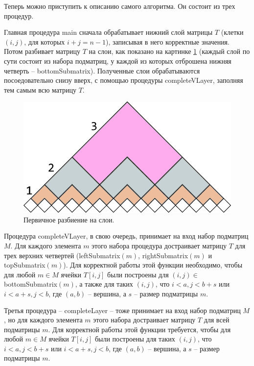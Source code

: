 \documentclass[12pt]{article}  %
\theoremstyle{definition}
\theoremstyle{remark}
\begin{document}
Теперь можно приступить к описанию самого алгоритма. Он состоит из трех процедур.

Главная процедура main сначала обрабатывает нижний слой матрицы $T$ (клетки $(i,j)$, для которых $i+j=n-1$), записывая в него корректные значения. Потом разбивает матрицу $T$ на слои, как показано на картинке \ref{gr:layers} (каждый слой по сути состоит из набора подматриц, у каждой из которых отброшена нижняя четверть -- bottomSubmatrix). Полученные слои обрабатываются посоедовательно снизу вверх, с помощью процедуры completeVLayer, заполняя тем самым всю матрицу $T$. 

\begin{figure}[!ht]
  \caption{Первичное разбиение на слои.}
  \label{gr:layers}
  \centering
    \includegraphics[width=0.9\linewidth]{layers.png}
\end{figure}

Процедура completeVLayer, в свою очередь, принимает на вход набор подматриц $M$. Для каждого элемента $m$ этого набора процедура достраивает матрицу $T$ для трех верхних четвертей (leftSubmatrix$(m)$, \linebreak rightSubmatrix$(m)$ и topSubmatrix$(m)$). Для корректной работы этой функции необходимо, чтобы для любой $m \in M$ ячейки $T[i,j]$ были построены  для $(i,j) \in\ $bottomSubmatrix$(m)$, а также для таких $(i,j)$, что $i < a, j < b+s$ или $i < a+s, j < b$, где $(a,b)$ -- вершина, а $s$ -- размер подматрицы $m$. 

Третья процедура -- completeLayer -- тоже принимает на вход набор подматриц $M$, но для каждого элемента $m$ этого набора достраивает матрицу $T$ для всей подматрицы $m$. Для корректной работы этой функции требуется, чтобы для любой $m \in M$ ячейки $T[i,j]$ были построены для таких $(i,j)$, что $i < a, j < b+s$ или $i < a+s, j < b$, где $(a,b)$ -- вершина, а $s$ -- размер подматрицы $m$. 
\end{document}
